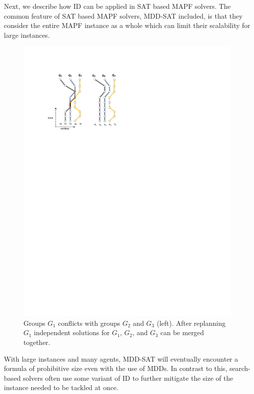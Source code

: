 \documentclass[jair,oneside,11pt]{article}
\begin{document}
Next, we describe how ID can be applied in SAT based MAPF solvers. The common feature of SAT based MAPF solvers, MDD-SAT included, is that they consider the entire MAPF instance as a whole which can limit their scalability for large instances.

\begin{figure}
\begin{center}
\includegraphics[trim={2.5cm 19.2cm 3.0cm 2.7cm},clip,width=1.0\textwidth]{fig_ID.pdf}
\end{center}
\caption{Groups $G_1$ conflicts with groups $G_2$ and $G_3$ (left). After replanning $G_1$ independent solutions for $G_1$, $G_2$, and $G_3$ can be merged together. } \label{figure-ID}
\end{figure}

With large instances and many agents, MDD-SAT will eventually encounter a formula of prohibitive size even with the use of MDDs. In contrast to this, search-based solvers often use some variant of ID to further mitigate the size of the instance needed to be tackled at once.
\end{document}
